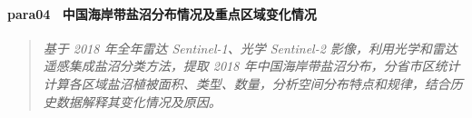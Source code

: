 \paragraph*{para04~
    \textcolor[RGB]{17, 205, 29}{中国海岸带盐沼分布情况及重点区域变化情况 }}
\begin{quotation}
    \itshape
    基于 2018 年全年雷达 Sentinel-1、光学 Sentinel-2 影像，利用光学和雷达遥感集成盐沼分类方法，提取 2018 年中国海岸带盐沼分布，分省市区统计计算各区域盐沼植被面积、类型、数量，分析空间分布特点和规律，结合历史数据解释其变化情况及原因。 
\end{quotation}

